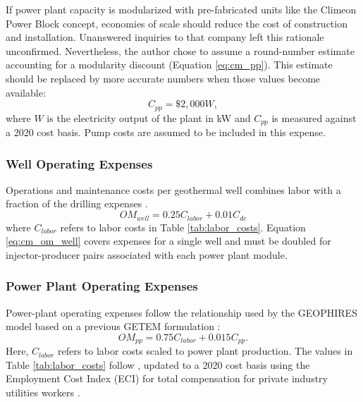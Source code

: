 If power plant capacity is modularized with pre-fabricated units like the Climeon Power Block concept, economies of scale should reduce the cost of construction and installation. Unanswered inquiries to that company left this rationale unconfirmed. Nevertheless, the author chose to assume a round-number estimate accounting for a modularity discount (Equation \ref{eq:cm_pp}). This estimate should be replaced by more accurate numbers when those values become available:
\begin{equation}
\label{eq:cm_pp}
    C_{pp} = \$2,000 %
    W,
\end{equation}
where $W$ is the electricity output of the plant in kW and $C_{pp}$ is measured against a 2020 cost basis. Pump costs are assumed to be included in this expense.

\subsubsection{Well Operating Expenses}\label{ch4:cm_opex_well}

Operations and maintenance costs per geothermal well combines labor with a fraction of the drilling expenses \citep[Equation 12,\ ][]{beckers_introducing_2013}.
\begin{equation}
\label{eq:cm_om_well}
    OM_{well} = 0.25 %
    C_{labor} + 0.01 %
    C_{dc}
\end{equation}
where $C_{labor}$ refers to labor costs in Table \ref{tab:labor_costs}. Equation \ref{eq:cm_om_well} covers expenses for a single well and must be doubled for injector-producer pairs associated with each power plant module.

\subsubsection{Power Plant Operating Expenses}\label{ch4:cm_opex_pp}

Power-plant operating expenses follow the relationship used by the GEOPHIRES model based on a previous GETEM formulation \citep[Equation 9,\ ][]{beckers_introducing_2013}:
\begin{equation}
\label{eq:cm_om_pp}
    OM_{pp} = 0.75 %
    C_{labor} + 0.015 %
    C_{pp}.
\end{equation}
Here, $C_{labor}$ refers to labor costs scaled to power plant production. The values in Table \ref{tab:labor_costs} follow \citet[Equation 10,\ ][]{beckers_introducing_2013}, updated to a 2020 cost basis using the Employment Cost Index (ECI) for total compensation for private industry utilities workers \citep{us_bls_eci_2021}.


